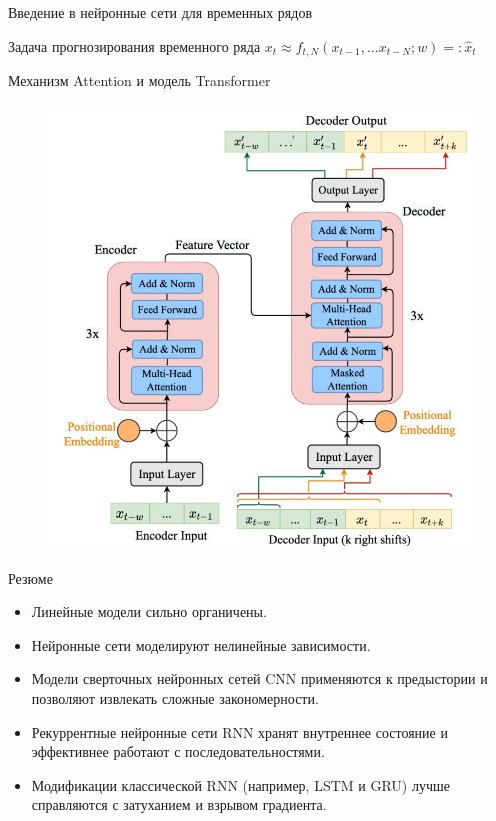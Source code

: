 \begin{frame}{Введение в нейронные сети для временных рядов}
    \item Задача прогнозирования временного ряда $x_{t} \approx f_{t,N}(x_{t-1},...x_{t-N};w) =: \hat{x}_{t}$
\end{frame}



\begin{frame}{Механизм Attention и модель Transformer}

\begin{figure}
    \includegraphics[width=0.7\linewidth]{lecture_4/figs/Transformer.png}
\end{figure}
\end{frame}

\begin{frame}{Резюме}
\begin{itemize}
    \item Линейные модели сильно органичены.
    \item Нейронные сети моделируют нелинейные зависимости.
    \item Модели сверточных нейронных сетей CNN применяются к предыстории и позволяют извлекать сложные закономерности.
    \item Рекуррентные нейронные сети RNN хранят внутреннее состояние и эффективнее работают с последовательностями.
    \item Модификации классической RNN (например, LSTM и GRU) лучше справляются с затуханием и взрывом градиента.
\end{itemize}
\end{frame}
 